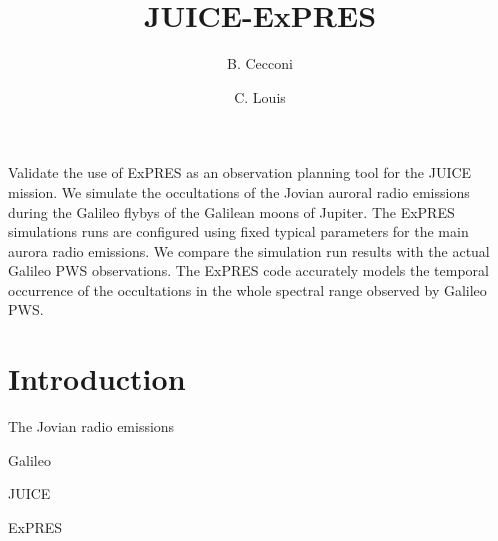 \documentclass[referee]{aa}
\begin{document}
 


   \title{JUICE-ExPRES}

   \subtitle{}

   \author{B. Cecconi
          \and
          C. Louis
          }


   \date{}

 
  \abstract
   {}
   {Validate the use of ExPRES as an observation planning tool for the JUICE mission.}
   {We simulate the occultations of the Jovian auroral radio emissions during the Galileo flybys of the Galilean moons of Jupiter. The ExPRES simulations runs are configured using fixed typical parameters for the main aurora radio emissions. We compare the simulation run results with the actual Galileo PWS observations.}
   {The ExPRES code accurately models the temporal occurrence of the occultations in the whole spectral range observed by Galileo PWS.}
   {}


   \maketitle
%

\section{Introduction}

The Jovian radio emissions

Galileo 

JUICE 

ExPRES \citep{Louis_AA_2019}   
\end{document}
